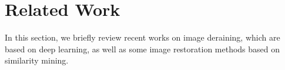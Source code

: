 \documentclass[letterpaper]{article} %
\begin{document}




%
\section{Related Work}
%
In this section, we briefly review recent works on image deraining, which are based on deep learning, as well as some image restoration methods based on similarity mining.
%
\end{document}
